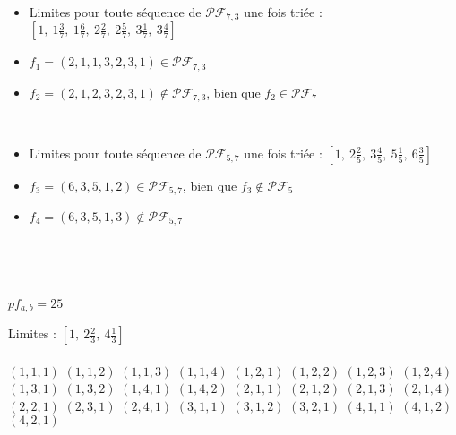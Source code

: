 \begin{example}[Définition 10 : $a > b$ : $a = 7$, $b = 3$]
    ~
    \begin{itemize}
        \item Limites pour toute séquence de $\mathcal{PF}_{7,3}$
            une fois triée : $[1,\ 1 \frac{3}{7},\ 1 \frac{6}{7},\ 
            2 \frac{2}{7},\ 2 \frac{5}{7},\ 3 \frac{1}{7},\ 
            3 \frac{4}{7}]$
        \item $f_1 = (2, 1, 1, 3, 2, 3, 1) \in
            \mathcal{PF}_{7,3}$
        \item $f_2 = (2, 1, 2, 3, 2, 3, 1) \notin
            \mathcal{PF}_{7,3}$, bien que $f_2 \in
            \mathcal{PF}_7$
    \end{itemize}
\end{example}

\begin{example}[Définition 10 : $a < b$ : $a = 5$, $b = 7$]
    ~
    \begin{itemize}
        \item Limites pour toute séquence de $\mathcal{PF}_{5,7}$
            une fois triée : $[1,\ 2 \frac{2}{5},\ 3 \frac{4}{5},\ 
            5 \frac{1}{5},\ 6 \frac{3}{5}]$
        \item $f_3 = (6, 3, 5, 1, 2) \in
            \mathcal{PF}_{5,7}$, bien que $f_3 \notin
            \mathcal{PF}_5$
        \item $f_4 = (6, 3, 5, 1, 3) \notin
            \mathcal{PF}_{5,7}$\\
    \end{itemize}
\end{example}

\begin{example}[Théorème 6 : $a = 3, b = 5$]
    ~\\
    \begin{itemize*}\\
        \item $pf_{a,b} = 25$
        \item Limites : $[1,\ 2 \frac{2}{3},\ 
            4 \frac{1}{3}]$\\\\
        \subitem $(1, 1, 1)$
        \subitem $(1, 1, 2)$
        \subitem $(1, 1, 3)$
        \subitem $(1, 1, 4)$
        \subitem $(1, 2, 1)$
        \subitem $(1, 2, 2)$
        \subitem $(1, 2, 3)$
        \subitem $(1, 2, 4)$
        \subitem $(1, 3, 1)$
        \subitem $(1, 3, 2)$
        \subitem $(1, 4, 1)$
        \subitem $(1, 4, 2)$
        \subitem $(2, 1, 1)$
        \subitem $(2, 1, 2)$
        \subitem $(2, 1, 3)$
        \subitem $(2, 1, 4)$
        \subitem $(2, 2, 1)$
        \subitem $(2, 3, 1)$
        \subitem $(2, 4, 1)$
        \subitem $(3, 1, 1)$
        \subitem $(3, 1, 2)$
        \subitem $(3, 2, 1)$
        \subitem $(4, 1, 1)$
        \subitem $(4, 1, 2)$
        \subitem $(4, 2, 1)$\\
    \end{itemize*}
\end{example}

